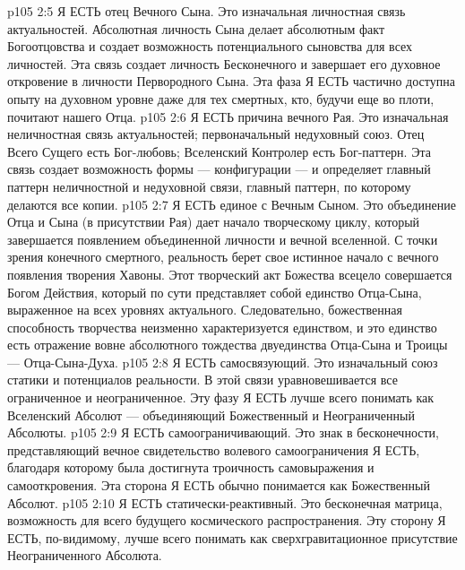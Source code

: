 \vs p105 2:5 \bibnobreakspace {} Я ЕСТЬ отец Вечного Сына. Это изначальная личностная связь актуальностей. Абсолютная личность Сына делает абсолютным факт Богоотцовства и создает возможность потенциального сыновства для всех личностей. Эта связь создает личность Бесконечного и завершает его духовное откровение в личности Первородного Сына. Эта фаза Я ЕСТЬ частично доступна опыту на духовном уровне даже для тех смертных, кто, будучи еще во плоти, почитают нашего Отца.
\vs p105 2:6 \bibnobreakspace {}  Я ЕСТЬ причина вечного Рая. Это изначальная неличностная связь актуальностей; первоначальный недуховный союз. Отец Всего Сущего есть Бог\hyp{}любовь; Вселенский Контролер есть Бог\hyp{}паттерн. Эта связь создает возможность формы --- конфигурации --- и определяет главный паттерн неличностной и недуховной связи, главный паттерн, по которому делаются все копии.
\vs p105 2:7 \bibnobreakspace {} Я ЕСТЬ единое с Вечным Сыном. Это объединение Отца и Сына (в присутствии Рая) дает начало творческому циклу, который завершается появлением объединенной личности и вечной вселенной. С точки зрения конечного смертного, реальность берет свое истинное начало с вечного появления творения Хавоны. Этот творческий акт Божества всецело совершается Богом Действия, который по сути представляет собой единство Отца\hyp{}Сына, выраженное на всех уровнях актуального. Следовательно, божественная способность творчества неизменно характеризуется единством, и это единство есть отражение вовне абсолютного тождества двуединства Отца\hyp{}Сына и Троицы --- Отца\hyp{}Сына\hyp{}Духа.
\vs p105 2:8 \bibnobreakspace {} Я ЕСТЬ самосвязующий. Это изначальный союз статики и потенциалов реальности. В этой связи уравновешивается все ограниченное и неограниченное. Эту фазу Я ЕСТЬ лучше всего понимать как Вселенский Абсолют --- объединяющий Божественный и Неограниченный Абсолюты.
\vs p105 2:9 \bibnobreakspace {} Я ЕСТЬ самоограничивающий. Это знак в бесконечности, представляющий вечное свидетельство волевого самоограничения Я ЕСТЬ, благодаря которому была достигнута троичность самовыражения и самооткровения. Эта сторона Я ЕСТЬ обычно понимается как Божественный Абсолют.
\vs p105 2:10 \bibnobreakspace {} Я ЕСТЬ статически\hyp{}реактивный. Это бесконечная матрица, возможность для всего будущего космического распространения. Эту сторону Я ЕСТЬ, по\hyp{}видимому, лучше всего понимать как сверхгравитационное присутствие Неограниченного Абсолюта.
